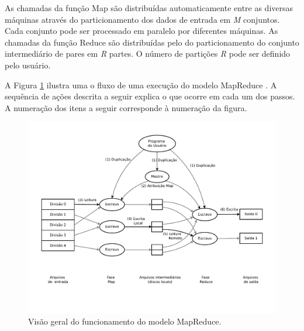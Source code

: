 As chamadas da função Map são distribuídas automaticamente entre as diversas máquinas através do particionamento dos dados de entrada em \textit{M} conjuntos. Cada conjunto pode ser processado em paralelo por diferentes máquinas. As chamadas da função Reduce são distribuídas pelo do particionamento do conjunto intermediário de pares em \textit{R} partes. O número de partições \textit{R} pode ser definido pelo usuário.

A Figura \ref{fig:MapReduceoverview} ilustra uma o fluxo de uma execução do modelo MapReduce \cite{Dean:2008}. A sequência de ações descrita a seguir explica o que ocorre em cada um dos passos. A numeração dos itens a seguir corresponde à numeração da figura.



 \begin{figure}[!htb]
 \centering
\includegraphics[trim=0cm 2cm 0cm 1cm, width=\textwidth]{figuras/MapReduceOverflow.pdf}
\caption{Visão geral do funcionamento do modelo MapReduce.}
\label{fig:MapReduceoverview}
\end{figure}



